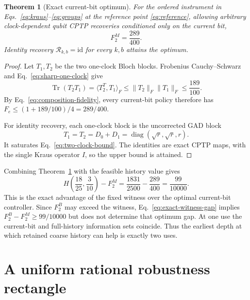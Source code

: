 \documentclass[11pt]{article}
\newtheorem{theorem}{Theorem}
\newcommand{\cR}{\mathcal R}
\newcommand{\id}{\mathrm{id}}
\newcommand{\Tr}{\operatorname{Tr}}
\newcommand{\diag}{\operatorname{diag}}
\begin{document}
\begin{theorem}[Exact current-bit optimum]
\label{thm:exact}
For the ordered instrument in Eqs.~\eqref{eq:kraus}--\eqref{eq:groups} at the
reference point \eqref{eq:reference}, allowing arbitrary clock-dependent qubit
CPTP recoveries conditioned only on the current bit,
\begin{equation}
 \boxed{F_2^M=\frac{289}{400}}.
\end{equation}
Identity recovery $\cR_{k,b}=\id$ for every $k,b$ attains the optimum.
\end{theorem}

\begin{proof}
Let $T_1,T_2$ be the two one-clock Bloch blocks. Frobenius
Cauchy--Schwarz and Eq.~\eqref{eq:sharp-one-clock} give
\begin{equation}
 \Tr(T_2T_1)=\langle T_2^T,T_1\rangle_F
 \le\|T_2\|_F\|T_1\|_F\le\frac{189}{100}.
 \label{eq:two-clock-bound}
\end{equation}
By Eq.~\eqref{eq:composition-fidelity}, every current-bit policy therefore has
$F_e\le(1+189/100)/4=289/400$.

For identity recovery, each one-clock block is the uncorrected GAD block
\begin{equation}
 T_1=T_2=D_0+D_1=\diag(\sqrt r,\sqrt r,r).
\end{equation}
It saturates Eq.~\eqref{eq:two-clock-bound}. The identities are exact CPTP maps,
with the single Kraus operator $I$, so the upper bound is attained.
\end{proof}

Combining Theorem~\ref{thm:exact} with the feasible history value gives
\begin{equation}
 H\!\left(\frac{18}{25},\frac3{10}\right)-F_2^M
 =\frac{1831}{2500}-\frac{289}{400}
 =\frac{99}{10000}.
 \label{eq:exact-witness-gap}
\end{equation}
This is the exact advantage of the fixed witness over the optimal current-bit
controller. Since $F_2^B$ may exceed the witness, Eq.~\eqref{eq:exact-witness-gap}
implies $F_2^B-F_2^M\ge99/10000$ but does not determine that optimum gap.
At one use the current-bit and full-history information sets coincide. Thus the
earliest depth at which retained coarse history can help is exactly two uses.

\section{A uniform rational robustness rectangle}
\label{sec:rectangle}
\end{document}
